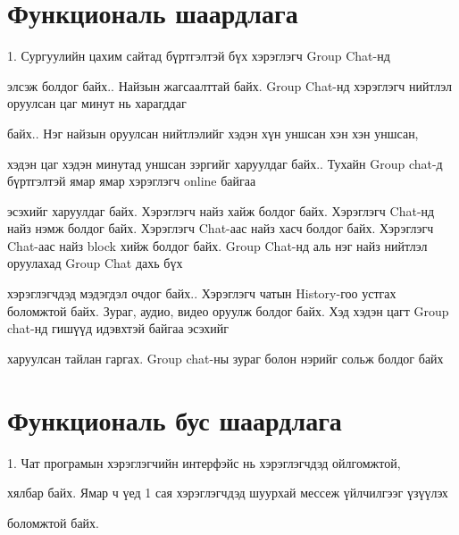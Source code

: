 \documentclass[a4paper, 11pt]
{article}
\begin{document}
	
	\section{Функциональ шаардлага}

	1.	Сургуулийн цахим сайтад бүртгэлтэй бүх хэрэглэгч Group Chat-нд 
	
	элсэж болдог байх..	Найзын жагсаалттай байх.	Group Chat-нд хэрэглэгч нийтлэл оруулсан цаг минут нь харагддаг 
	
	байх..	Нэг найзын оруулсан нийтлэлийг хэдэн хүн уншсан хэн хэн уншсан, 
	
	хэдэн цаг хэдэн минутад уншсан зэргийг харуулдаг байх..	Тухайн Group chat-д бүртгэлтэй ямар ямар хэрэглэгч online байгаа 
	
	эсэхийг харуулдаг байх.	Хэрэглэгч найз хайж болдог байх.	 Хэрэглэгч Chat-нд найз нэмж болдог байх.	 Хэрэглэгч Chat-аас найз хасч болдог байх.	 Хэрэглэгч Chat-аас найз block хийж болдог байх.	Group Chat-нд аль нэг найз нийтлэл оруулахад  Group Chat дахь бүх
	
	 хэрэглэгчдэд мэдэгдэл очдог байх..	Хэрэглэгч чатын History-гоо устгах боломжтой байх.	Зураг, аудио, видео оруулж болдог байх.	Хэд хэдэн цагт Group chat-нд гишүүд идэвхтэй байгаа эсэхийг 
	
	харуулсан тайлан гаргах.	Group chat-ны зураг болон нэрийг сольж болдог байх\newline

	\section{Функциональ бус шаардлага}
	1.	Чат програмын хэрэглэгчийн интерфэйс нь хэрэглэгчдэд ойлгомжтой,
	
	 хялбар байх.	Ямар ч үед 1 сая хэрэглэгчдэд шуурхай мессеж үйлчилгээг үзүүлэх
	
	 боломжтой байх.
	
	
	
	
	
	
	
\end{document}
